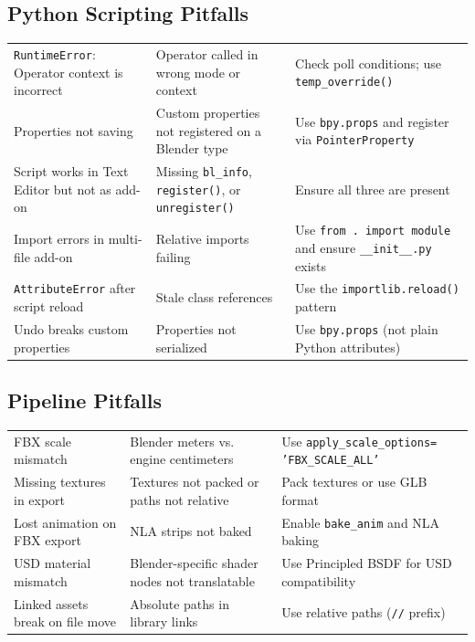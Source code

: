 \subsection{Python Scripting Pitfalls}

\begin{center}
\begin{tabularx}{\textwidth}{L{3cm}L{3.5cm}X}
\toprule
{}
 &  &  \\
\midrule
\texttt{RuntimeError}: Operator context is incorrect & Operator called in wrong mode or context & Check poll conditions; use \texttt{temp\_override()} \\
Properties not saving & Custom properties not registered on a Blender type & Use \texttt{bpy.props} and register via \texttt{PointerProperty} \\
Script works in Text Editor but not as add-on & Missing \texttt{bl\_info}, \texttt{register()}, or \texttt{unregister()} & Ensure all three are present \\
Import errors in multi-file add-on & Relative imports failing & Use \texttt{from . import module} and ensure \texttt{\_\_init\_\_.py} exists \\
\texttt{AttributeError} after script reload & Stale class references & Use the \texttt{importlib.reload()} pattern \\
Undo breaks custom properties & Properties not serialized & Use \texttt{bpy.props} (not plain Python attributes) \\
\bottomrule
\end{tabularx}
\end{center}

\subsection{Pipeline Pitfalls}

\begin{center}
\begin{tabularx}{\textwidth}{L{3cm}L{3.5cm}X}
\toprule
{}
 &  &  \\
\midrule
FBX scale mismatch & Blender meters vs. engine centimeters & Use \texttt{apply\_scale\_options= 'FBX\_SCALE\_ALL'} \\
Missing textures in export & Textures not packed or paths not relative & Pack textures or use GLB format \\
Lost animation on FBX export & NLA strips not baked & Enable \texttt{bake\_anim} and NLA baking \\
USD material mismatch & Blender-specific shader nodes not translatable & Use Principled BSDF for USD compatibility \\
Linked assets break on file move & Absolute paths in library links & Use relative paths (\texttt{//} prefix) \\
\bottomrule
\end{tabularx}
\end{center}

